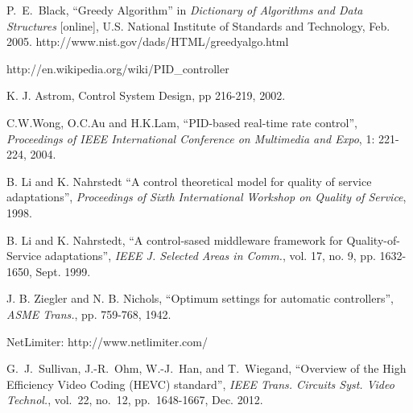 \documentclass[journal,draftclsnofoot,onecolumn]{IEEEtran}
\begin{document}
\begin{thebibliography}{1}
P.~E.~Black, ``Greedy Algorithm'' in {\em Dictionary of Algorithms and Data Structures} [online], U.S. National Institute of Standards and Technology, Feb. 2005.
\newblock http://www.nist.gov/dads/HTML/greedyalgo.html

http://en.wikipedia.org/wiki/PID\_controller

K. J. Astrom, Control System Design, pp 216-219, 2002.

C.W.Wong, O.C.Au and H.K.Lam, ``PID-based real-time rate control'', {\em Proceedings of IEEE International Conference on Multimedia and Expo}, 1: 221-224, 2004.

B. Li and K. Nahrstedt  ``A control theoretical model for quality of service adaptations'', {\em Proceedings of Sixth International Workshop on Quality of Service}, 1998.

B. Li and K. Nahrstedt, ``A control-sased middleware framework for Quality-of-Service adaptations'', {\em IEEE J. Selected Areas in Comm.}, vol. 17, no. 9, pp. 1632-1650, Sept. 1999.

J. B. Ziegler and N. B. Nichols, ``Optimum settings for automatic controllers'', {\em ASME Trans.}, pp. 759-768, 1942.

NetLimiter: http://www.netlimiter.com/

G.~J.~Sullivan, J.-R.~Ohm, W.-J.~Han, and T.~Wiegand, ``Overview of the High Efficiency Video Coding (HEVC) standard'', {\em IEEE Trans. Circuits Syst. Video Technol.}, vol.~22, no.~12, pp.~1648-1667, Dec. 2012. 

\end{thebibliography}



% 
\end{document}
